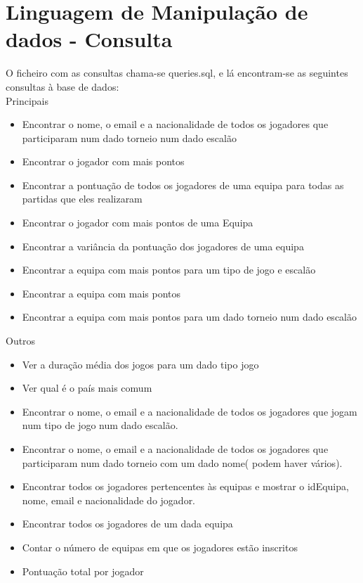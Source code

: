 \documentclass[a4paper]{article}
\begin{document}
\section{Linguagem de Manipulação de dados - Consulta}
O ficheiro com as consultas chama-se queries.sql, e lá encontram-se as seguintes consultas à base de dados:
\\\newline
Principais
\begin{itemize}
  \item Encontrar o nome, o email e a nacionalidade de todos os jogadores que participaram num dado torneio num dado escalão
  \item Encontrar o jogador com mais pontos
  \item Encontrar a pontuação de todos os jogadores de uma equipa para todas as partidas que eles realizaram
  \item Encontrar o jogador com mais pontos de uma Equipa
  \item Encontrar a variância da pontuação dos jogadores de uma equipa
  \item Encontrar a equipa com mais pontos para um tipo de jogo e escalão
  \item Encontrar a equipa com mais pontos
  \item Encontrar a equipa com mais pontos para um dado torneio num dado escalão
\end{itemize}

Outros
\begin{itemize}
  \item Ver a duração média dos jogos para um dado tipo jogo
  \item Ver qual é o país mais comum
  \item Encontrar o nome, o email e a nacionalidade de todos os jogadores que jogam num tipo de jogo num dado escalão.
  \item Encontrar o nome, o email e a nacionalidade de todos os jogadores que participaram num dado torneio com um dado nome( podem haver vários).
  \item Encontrar todos os jogadores pertencentes às equipas e mostrar o idEquipa, nome, email e nacionalidade do jogador.
  \item Encontrar todos os jogadores de um dada equipa
  \item Contar o número de equipas em que os jogadores estão inscritos
  \item Pontuação total por jogador
\end{itemize}
\end{document}
